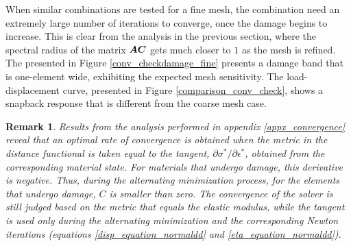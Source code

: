 \documentclass[10pt]{cas-sc}
\newtheorem*{remark}{Remark}
\begin{document}
When similar combinations are tested for a fine mesh, the  combination need an extremely large number of iterations to converge, once the damage begins to increase. This is clear from the analysis in the previous section, where the spectral radius of the matrix $\mbox{\boldmath $A$} \mbox{\boldmath $C$} $ gets much closer to $1$ as the mesh is refined.  The presented in Figure \ref{conv_checkdamage_fine}\added{,} presents a damage band that is one-element wide, exhibiting the expected mesh sensitivity. The load-displacement curve, presented in Figure \ref{comparison_conv_check}, shows a snapback response that is different from the coarse mesh case.


\begin{remark}
	Results from the analysis performed in appendix \ref{appx_convergence} reveal that an optimal rate of convergence is obtained when the metric in the distance functional is taken equal to the tangent, ${\partial \sigma^*}/{\partial \epsilon^*}$, obtained from the corresponding material state. For materials that undergo damage, this derivative is negative. Thus, during the alternating minimization process, for the elements that undergo damage, $C$ is smaller than zero. The convergence of the solver is still judged based on the metric that equals the elastic modulus, while the tangent is used only during the alternating minimization and the corresponding Newton iterations (equations \ref{disp_equation_normaldd} and \ref{eta_equation_normaldd}).
\end{remark}
\end{document}
